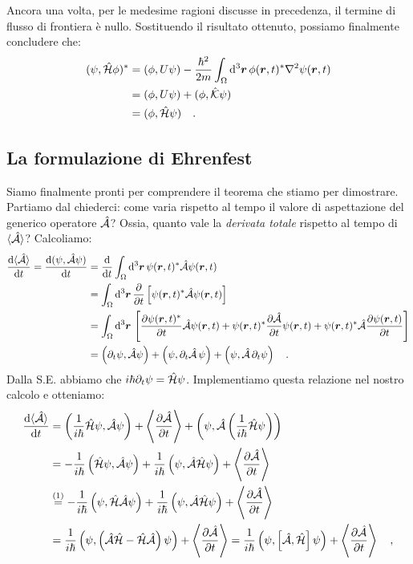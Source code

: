 Ancora una volta, per le medesime ragioni discusse in precedenza, il termine di flusso di frontiera è nullo. Sostituendo il risultato ottenuto, possiamo finalmente concludere che:
\begin{equation}
    \begin{aligned}
        (\psi, \hat{\mathcal{H}}\phi)^* &= (\phi, U\psi) -\frac{\hbar^2}{2m} \int_\Omega \dd^3{\bm{r}} \, \phi(\bm{r},t)^*\nabla^2\psi(\bm{r},t) \\
        &= (\phi, U\psi) + (\phi, \hat{\mathcal{K}}\psi) \\
        &= (\phi, \hat{\mathcal{H}}\psi) \quad. 
    \end{aligned}
\end{equation}

\subsection{La formulazione di Ehrenfest}
Siamo finalmente pronti per comprendere il teorema che stiamo per dimostrare. Partiamo dal chiederci: come varia rispetto al tempo il valore di aspettazione del generico operatore $\hat{\mathcal{A}}$? Ossia, quanto vale la \emph{derivata totale} rispetto al tempo di $\langle \hat{\mathcal{A}} \rangle$? Calcoliamo:
\[
\begin{aligned}
    \dv{\langle \hat{\mathcal{A}} \rangle}{t} = \dv{(\psi, \hat{\mathcal{A}}\psi)}{t} &= \dv{}{t}\int_\Omega \dd^3{\bm{r}} \, \psi(\bm{r},t)^* \hat{\mathcal{A}} \psi(\bm{r},t) \\
    &=  \int_\Omega \dd^3{\bm{r}} \, \pdv{}{t}\left[ \psi(\bm{r},t)^* \hat{\mathcal{A}} \psi(\bm{r},t) \right] \\
    &= \int_\Omega \dd^3{\bm{r}} \, \left[ \pdv{\psi(\bm{r},t)^*}{t}\hat{\mathcal{A}}\psi(\bm{r},t) + \psi(\bm{r},t)^*\pdv{\hat{\mathcal{A}}}{t}\psi(\bm{r},t) + \psi(\bm{r},t)^*\hat{\mathcal{A}}\pdv{\psi(\bm{r},t)}{t} \right] \\
    &= \left(\partial_t\psi, \hat{\mathcal{A}}\psi\right) + \left(\psi, \partial_t\hat{\mathcal{A}} \, \psi \right) + \left(\psi, \hat{\mathcal{A}} \, \partial_t\psi\right) \quad.
    \end{aligned}
\]
Dalla S.E. abbiamo che $i\hbar \partial_t \psi = \hat{\mathcal{H}}\psi$. Implementiamo questa relazione nel nostro calcolo e otteniamo:
\[
    \begin{aligned}
        \dv{\langle \hat{\mathcal{A}} \rangle}{t} &= \left( \frac{1}{i\hbar}\hat{\mathcal{H}}\psi, \hat{\mathcal{A}}\psi \right) + \left\langle \pdv{\hat{\mathcal{A}}}{t} \right\rangle + \left(\psi, \hat{\mathcal{A}}\left(\frac{1}{i\hbar}\hat{\mathcal{H}}\psi\right) \right) \\
        &= -\frac{1}{i\hbar} \left( \hat{\mathcal{H}}\psi, \hat{\mathcal{A}}\psi \right) + \frac{1}{i\hbar} \left(\psi, \hat{\mathcal{A}}\hat{\mathcal{H}}\psi\right) + \left\langle \pdv{\hat{\mathcal{A}}}{t} \right\rangle \\
        &\overset{(1)}{=} -\frac{1}{i\hbar} \left( \psi, \hat{\mathcal{H}}\hat{\mathcal{A}}\psi \right) + \frac{1}{i\hbar} \left(\psi, \hat{\mathcal{A}}\hat{\mathcal{H}}\psi\right) + \left\langle \pdv{\hat{\mathcal{A}}}{t} \right\rangle \\
        & = \frac{1}{i\hbar}\left( \psi, \left( \hat{\mathcal{A}}\hat{\mathcal{H}} - \hat{\mathcal{H}}\hat{\mathcal{A}} \right) \psi \right) + \left\langle \pdv{\hat{\mathcal{A}}}{t} \right\rangle = \frac{1}{i\hbar}\left( \psi, \left[ \hat{\mathcal{A}},\hat{\mathcal{H}} \right] \psi \right) + \left\langle \pdv{\hat{\mathcal{A}}}{t} \right\rangle \quad,
    \end{aligned}
\]
